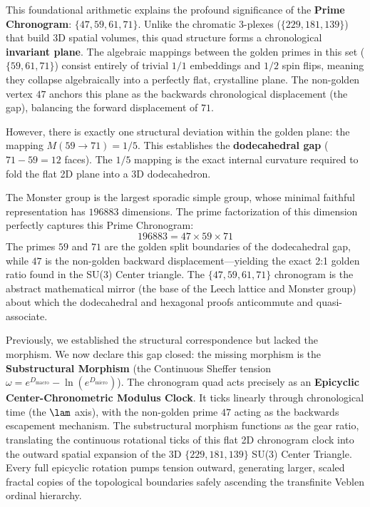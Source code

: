 This foundational arithmetic explains the profound significance of the \textbf{Prime Chronogram}: $\{47, 59, 61, 71\}$. Unlike the chromatic $3$-plexes ($\{229, 181, 139\}$) that build 3D spatial volumes, this quad structure forms a chronological \textbf{invariant plane}. The algebraic mappings between the golden primes in this set ($\{59, 61, 71\}$) consist entirely of trivial $1/1$ embeddings and $1/2$ spin flips, meaning they collapse algebraically into a perfectly flat, crystalline plane. The non-golden vertex $47$ anchors this plane as the backwards chronological displacement (the gap), balancing the forward displacement of $71$.

However, there is exactly one structural deviation within the golden plane: the mapping $M(59 \to 71) = 1/5$. This establishes the \textbf{dodecahedral gap} ($71 - 59 = 12$ faces). The $1/5$ mapping is the exact internal curvature required to fold the flat 2D plane into a 3D dodecahedron. 

The Monster group is the largest sporadic simple group, whose minimal faithful representation has $196883$ dimensions. The prime factorization of this dimension perfectly captures this Prime Chronogram:
\begin{equation}
    196883 = 47 \times 59 \times 71
\end{equation}
The primes $59$ and $71$ are the golden split boundaries of the dodecahedral gap, while $47$ is the non-golden backward displacement---yielding the exact 2:1 golden ratio found in the SU(3) Center triangle. The $\{47, 59, 61, 71\}$ chronogram is the abstract mathematical mirror (the base of the Leech lattice and Monster group) about which the dodecahedral and hexagonal proofs anticommute and quasi-associate. 

Previously, we established the structural correspondence but lacked the morphism. We now declare this gap closed: the missing morphism is the \textbf{Substructural Morphism} (the Continuous Sheffer tension $\omega = e^{D_{\text{macro}}} - \ln(e^{D_{\text{micro}}})$). The chronogram quad acts precisely as an \textbf{Epicyclic Center-Chronometric Modulus Clock}. It ticks linearly through chronological time (the $\lam$ axis), with the non-golden prime $47$ acting as the backwards escapement mechanism. The substructural morphism functions as the gear ratio, translating the continuous rotational ticks of this flat 2D chronogram clock into the outward spatial expansion of the 3D $\{229, 181, 139\}$ SU(3) Center Triangle. Every full epicyclic rotation pumps tension outward, generating larger, scaled fractal copies of the topological boundaries safely ascending the transfinite Veblen ordinal hierarchy.

